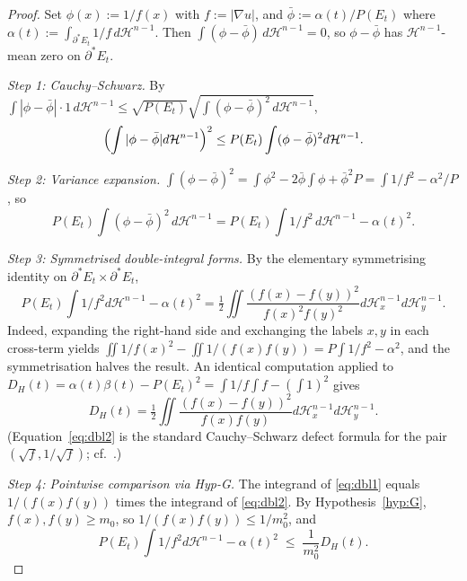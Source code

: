 \documentclass[11pt]{article}
\theoremstyle{definition}
\begin{document}
\begin{proof}
Set $\phi(x):=1/f(x)$ with $f:=|\nabla u|$, and
$\bar\phi:=\alpha(t)/P(E_{t})$ where
$\alpha(t):=\int_{\partial^{*}E_{t}}1/f\,d\mathcal H^{n-1}$.  Then
$\int(\phi-\bar\phi)\,d\mathcal H^{n-1}=0$, so $\phi-\bar\phi$ has
$\mathcal H^{n-1}$-mean zero on $\partial^{*}E_{t}$.

\emph{Step 1: Cauchy--Schwarz.}  By
$\int|\phi-\bar\phi|\cdot 1\,d\mathcal H^{n-1}
\le\sqrt{P(E_{t})}\sqrt{\int(\phi-\bar\phi)^{2}\,d\mathcal H^{n-1}}$,
\begin{equation}\label{eq:CSstep}
   \Bigl(\int|\phi-\bar\phi|d\mathcal H^{n-1}\Bigr)^{2}
   \le P(E_{t})\int(\phi-\bar\phi)^{2}d\mathcal H^{n-1}.
\end{equation}

\emph{Step 2: Variance expansion.}
$\int(\phi-\bar\phi)^{2}=\int\phi^{2}-2\bar\phi\int\phi+\bar\phi^{2}P
=\int 1/f^{2}-\alpha^{2}/P$, so
\begin{equation}\label{eq:varexp}
   P(E_{t})\int(\phi-\bar\phi)^{2}\,d\mathcal H^{n-1}
   =P(E_{t})\int 1/f^{2}\,d\mathcal H^{n-1} -\alpha(t)^{2}.
\end{equation}

\emph{Step 3: Symmetrised double-integral forms.}  By the elementary
symmetrising identity on
$\partial^{*}E_{t}\times\partial^{*}E_{t}$,
\begin{equation}\label{eq:dbl1}
   P(E_{t})\!\int\!1/f^{2}d\mathcal H^{n-1}-\alpha(t)^{2}
   =\tfrac{1}{2}\iint
     \frac{(f(x)-f(y))^{2}}{f(x)^{2}f(y)^{2}}
     d\mathcal H^{n-1}_{x}d\mathcal H^{n-1}_{y}.
\end{equation}
Indeed, expanding the right-hand side and exchanging the labels $x,y$ in
each cross-term yields
$\iint 1/f(x)^{2}-\iint 1/(f(x)f(y))=P\int 1/f^{2}-\alpha^{2}$, and the
symmetrisation halves the result.  An identical computation applied to
$D_{H}(t)=\alpha(t)\beta(t)-P(E_{t})^{2}=\int 1/f\int f-(\int 1)^{2}$
gives
\begin{equation}\label{eq:dbl2}
   D_{H}(t)=\tfrac{1}{2}\iint
     \frac{(f(x)-f(y))^{2}}{f(x)f(y)}
     d\mathcal H^{n-1}_{x}d\mathcal H^{n-1}_{y}.
\end{equation}
(Equation~\eqref{eq:dbl2} is the standard Cauchy--Schwarz defect
formula for the pair $(\sqrt{f},1/\sqrt{f})$; cf.\
\cite[\S 1]{BrothersZiemer1988}.)

\emph{Step 4: Pointwise comparison via Hyp-G.}  The integrand of
\eqref{eq:dbl1} equals $1/(f(x)f(y))$ times the integrand of
\eqref{eq:dbl2}.  By Hypothesis~\ref{hyp:G}, $f(x),f(y)\ge m_{0}$, so
$1/(f(x)f(y))\le 1/m_{0}^{2}$, and
\begin{equation}\label{eq:ratio}
   P(E_{t})\int 1/f^{2}d\mathcal H^{n-1}-\alpha(t)^{2}
   \;\le\;\frac{1}{m_{0}^{2}}D_{H}(t).
\end{equation}


\end{proof}
\end{document}

